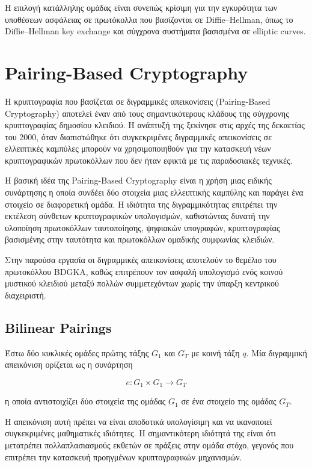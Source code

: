 \documentclass[12pt,a4paper]{report}
\begin{document}
Η επιλογή κατάλληλης ομάδας είναι συνεπώς κρίσιμη για την εγκυρότητα των υποθέσεων ασφάλειας σε πρωτόκολλα που βασίζονται σε Diffie--Hellman, όπως το Diffie--Hellman key exchange και σύγχρονα συστήματα βασισμένα σε elliptic curves.


\section{Pairing-Based Cryptography}

Η κρυπτογραφία που βασίζεται σε διγραμμικές απεικονίσεις
(Pairing-Based Cryptography) αποτελεί έναν από τους σημαντικότερους
κλάδους της σύγχρονης κρυπτογραφίας δημοσίου κλειδιού.
Η ανάπτυξή της ξεκίνησε στις αρχές της δεκαετίας του 2000, όταν
διαπιστώθηκε ότι συγκεκριμένες διγραμμικές απεικονίσεις σε
ελλειπτικές καμπύλες μπορούν να χρησιμοποιηθούν για την κατασκευή
νέων κρυπτογραφικών πρωτοκόλλων που δεν ήταν εφικτά με τις
παραδοσιακές τεχνικές.

Η βασική ιδέα της Pairing-Based Cryptography είναι η χρήση μιας
ειδικής συνάρτησης η οποία συνδέει δύο στοιχεία μιας ελλειπτικής
καμπύλης και παράγει ένα στοιχείο σε διαφορετική ομάδα.
Η ιδιότητα της διγραμμικότητας επιτρέπει την εκτέλεση σύνθετων
κρυπτογραφικών υπολογισμών, καθιστώντας δυνατή την υλοποίηση
πρωτοκόλλων ταυτοποίησης, ψηφιακών υπογραφών, κρυπτογραφίας
βασισμένης στην ταυτότητα και πρωτοκόλλων ομαδικής συμφωνίας
κλειδιών.

Στην παρούσα εργασία οι διγραμμικές απεικονίσεις αποτελούν το
θεμέλιο του πρωτοκόλλου BDGKA, καθώς επιτρέπουν τον ασφαλή
υπολογισμό ενός κοινού μυστικού κλειδιού μεταξύ πολλών
συμμετεχόντων χωρίς την ύπαρξη κεντρικού διαχειριστή.

\subsection{Bilinear Pairings}

Έστω δύο κυκλικές ομάδες πρώτης τάξης \(G_1\) και \(G_T\)
με κοινή τάξη \(q\).
Μία διγραμμική απεικόνιση ορίζεται ως η συνάρτηση

\[
e : G_1 \times G_1 \rightarrow G_T
\]

η οποία αντιστοιχίζει δύο στοιχεία της ομάδας \(G_1\)
σε ένα στοιχείο της ομάδας \(G_T\).

Η απεικόνιση αυτή πρέπει να είναι αποδοτικά υπολογίσιμη
και να ικανοποιεί συγκεκριμένες μαθηματικές ιδιότητες.
Η σημαντικότερη ιδιότητά της είναι ότι μετατρέπει
πολλαπλασιασμούς εκθετών σε πράξεις στην ομάδα στόχο,
γεγονός που επιτρέπει την κατασκευή προηγμένων
κρυπτογραφικών μηχανισμών.
\end{document}
